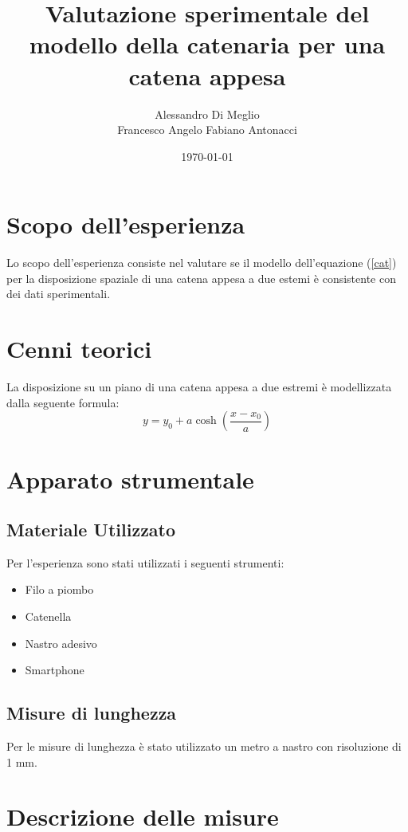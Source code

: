 \documentclass{article}
\title{Valutazione sperimentale del modello della catenaria per una catena appesa}
\author{Alessandro Di Meglio \\ Francesco Angelo Fabiano Antonacci}
\date{\today}
\begin{document}
\maketitle
\section{Scopo dell'esperienza}
Lo scopo dell'esperienza consiste nel valutare se il modello dell'equazione (\ref{cat}) per la disposizione spaziale di una catena appesa a due estemi è consistente con dei dati sperimentali.

\section{Cenni teorici}

La disposizione su un piano di una catena appesa a due estremi è modellizzata dalla seguente formula:
\begin{equation}
y =  y_0 + a \cosh\left(\frac{x - x_0}{a}\right)
\label{cat}
\end{equation}

\section{Apparato strumentale}

\subsection{Materiale Utilizzato}

Per l'esperienza sono stati utilizzati i seguenti strumenti:
\begin{itemize}
\item Filo a piombo
\item Catenella
\item Nastro adesivo
\item Smartphone
\end{itemize}


\subsection{Misure di lunghezza}
Per le misure di lunghezza è stato utilizzato un metro a nastro con risoluzione di 1 mm.



\section{Descrizione delle misure}
\end{document}
